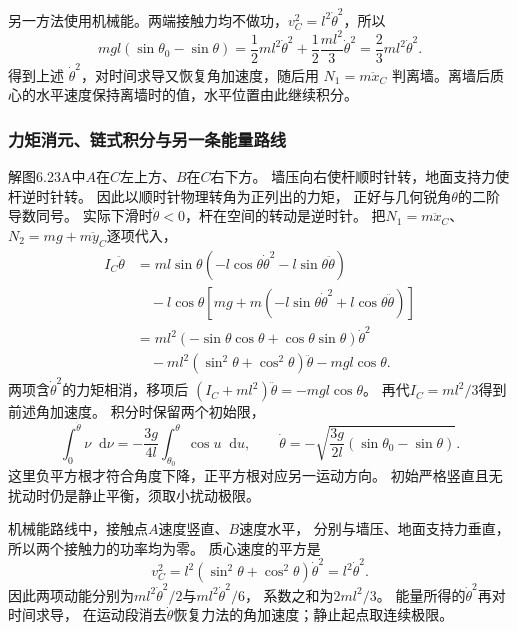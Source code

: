 \documentclass[UTF8,fontset=fandol,a4paper,11pt]{ctexart}
\newcommand{\dd}{\mathop{}\!\mathrm{d}}
\begin{document}
另一方法使用机械能。两端接触力均不做功，$v_C^2=l^2\dot\theta^2$，所以
\[
 mgl(\sin\theta_0-\sin\theta)
 =\frac12ml^2\dot\theta^2+\frac12\frac{ml^2}{3}\dot\theta^2
 =\frac23ml^2\dot\theta^2.
\]
得到上述 $\dot\theta^2$，对时间求导又恢复角加速度，随后用 $N_1=m\ddot x_C$ 判离墙。离墙后质心的水平速度保持离墙时的值，水平位置由此继续积分。
\subsubsection*{力矩消元、链式积分与另一条能量路线}
解图6.23A中$A$在$C$左上方、$B$在$C$右下方。
墙压向右使杆顺时针转，地面支持力使杆逆时针转。
因此以顺时针物理转角为正列出的力矩，
正好与几何锐角$\theta$的二阶导数同号。
实际下滑时$\dot\theta<0$，杆在空间的转动是逆时针。
把$N_1=m\ddot x_C$、$N_2=mg+m\ddot y_C$逐项代入，
\[
\begin{aligned}
I_C\ddot\theta
&=ml\sin\theta(-l\cos\theta\dot\theta^2-l\sin\theta\ddot\theta)\\
&\quad-l\cos\theta[mg+m(-l\sin\theta\dot\theta^2+l\cos\theta\ddot\theta)]\\
&=ml^2(-\sin\theta\cos\theta+\cos\theta\sin\theta)\dot\theta^2\\
&\quad-ml^2(\sin^2\theta+\cos^2\theta)\ddot\theta-mgl\cos\theta.
\end{aligned}
\]
两项含$\dot\theta^2$的力矩相消，移项后
$(I_C+ml^2)\ddot\theta=-mgl\cos\theta$。
再代$I_C=ml^2/3$得到前述角加速度。
积分时保留两个初始限，
\[
\int_0^{\dot\theta}\nu\dd\nu
=-\frac{3g}{4l}\int_{\theta_0}^{\theta}\cos u\dd u,
\qquad \dot\theta=-\sqrt{\frac{3g}{2l}(\sin\theta_0-\sin\theta)}.
\]
这里负平方根才符合角度下降，正平方根对应另一运动方向。
初始严格竖直且无扰动时仍是静止平衡，须取小扰动极限。

机械能路线中，接触点$A$速度竖直、$B$速度水平，
分别与墙压、地面支持力垂直，所以两个接触力的功率均为零。
质心速度的平方是
\[
v_C^2=l^2(\sin^2\theta+\cos^2\theta)\dot\theta^2=l^2\dot\theta^2.
\]
因此两项动能分别为$ml^2\dot\theta^2/2$与$ml^2\dot\theta^2/6$，
系数之和为$2ml^2/3$。
能量所得的$\dot\theta^2$再对时间求导，
在运动段消去$\dot\theta$恢复力法的角加速度；静止起点取连续极限。
\end{document}
